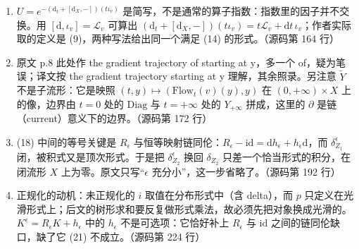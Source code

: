 \begin{enumerate}
  \item $U=e^{-(\mathrm{d}_t+[\mathrm{d}_X,-])(t\iota_v)}$ 是简写，不是通常的算子指数：指数里的因子并不交换。用 $[\mathrm{d},\iota_v]=\mathcal L_v$ 可算出 $(\mathrm{d}_t+[\mathrm{d}_X,-])(t\iota_v)=t\mathcal L_v+\mathrm{d}t\,\iota_v$；作者实际取的定义是 (9)，两种写法给出同一个满足 (14) 的形式。\hfill{\footnotesize （源码第 164 行）}
  \item 原文 p.8 此处作 the gradient trajectory of starting at y，多一个 of，疑为笔误；译文按 the gradient trajectory starting at y 理解，其余照录。另注意 $\widetilde Y$ 不是子流形：它是映照 $(t,y)\mapsto(\mathrm{Flow}_t(v)(y),y)$ 在 $(0,+\infty)\times X$ 上的像，边界由 $t=0$ 处的 $\mathrm{Diag}$ 与 $t=+\infty$ 处的 $Y_{+\infty}$ 拼成，这里的 $\partial$ 是链（current）意义下的边界。\hfill{\footnotesize （源码第 172 行）}
  \item (18) 中间的等号关键是 $R_\epsilon$ 与恒等映射链同伦：$R_\epsilon-\mathrm{id}=\mathrm{d}h_\epsilon+h_\epsilon\mathrm{d}$，而 $\delta^\epsilon_{Z_1}$ 闭，被积式又是顶次形式。于是把 $\delta^\epsilon_{Z_2}$ 换回 $\delta_{Z_2}$ 只差一个恰当形式的积分，在闭流形 $X$ 上为零。原文只写“$\epsilon$ 充分小”，这一步省略了。\hfill{\footnotesize （源码第 192 行）}
  \item 正规化的动机：未正规化的 $i$ 取值在分布形式中（含 delta），而 $p$ 只定义在光滑形式上；后文的树形求和要反复做形式乘法，故必须先把对象换成光滑的。$K^\epsilon=R_\epsilon K+h_\epsilon$ 中的 $h_\epsilon$ 不是可选项：它恰好补上 $R_\epsilon$ 与 $\mathrm{id}$ 之间的链同伦缺口，缺了它 (21) 不成立。\hfill{\footnotesize （源码第 224 行）}
\end{enumerate}

